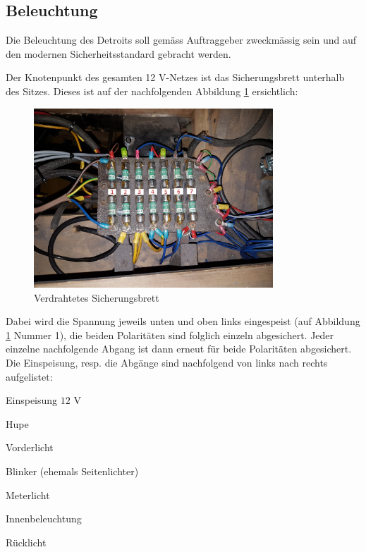 \subsection{Beleuchtung}

Die Beleuchtung des Detroits soll gemäss Auftraggeber zweckmässig sein und auf den modernen Sicherheitsstandard gebracht werden.

\color{blue}
Der Knotenpunkt des gesamten 12 V-Netzes ist das Sicherungsbrett unterhalb des Sitzes. Dieses ist auf der nachfolgenden Abbildung \ref{fig:Sicherungsbrett} ersichtlich:

\begin{figure}[h!]
	\centering
		\includegraphics[width=0.8\textwidth]{images/Sicherungsbrett}
	\caption{Verdrahtetes Sicherungsbrett}
	\label{fig:Sicherungsbrett}
\end{figure}

Dabei wird die Spannung jeweils unten und oben links eingespeist (auf Abbildung \ref{fig:Sicherungsbrett} Nummer 1), die beiden Polaritäten sind folglich einzeln abgesichert. Jeder einzelne nachfolgende Abgang ist dann erneut für beide Polaritäten abgesichert. Die Einspeisung, resp. die Abgänge sind nachfolgend von links nach rechts aufgelistet:

\begin{compactenum}
\item Einspeisung $12$ V
\item Hupe
\item Vorderlicht
\item Blinker (ehemals Seitenlichter)
\item Meterlicht
\item Innenbeleuchtung
\item Rücklicht
\end{compactenum}

